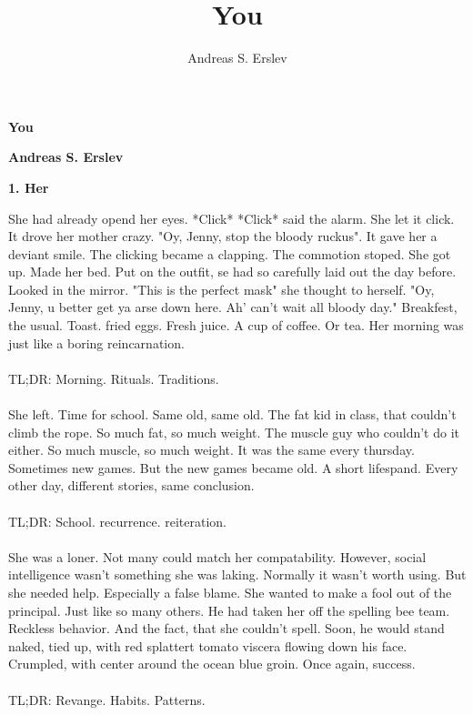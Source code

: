 \documentclass[]{article}
\title{You}
\author{Andreas S. Erslev}
\begin{document}
\begin{center}
	\Large\textbf{You}
\end{center}
\begin{center}
	\large\textbf{Andreas S. Erslev}
\end{center}

\begin{center}
	\large\textbf{1. Her}
\end{center}

She had already opend her eyes. *Click* *Click* said the alarm. She let it click. It drove her mother crazy. "Oy, Jenny, stop the bloody ruckus". It gave her a deviant smile. The clicking became a clapping. The commotion stoped. She got up. Made her bed. Put on the outfit, se had so carefully laid out the day before. Looked in the mirror. "This is the perfect mask" she thought to herself. "Oy, Jenny, u better get ya arse down here. Ah' can't wait all bloody day." Breakfest, the usual. Toast. fried eggs. Fresh juice. A cup of coffee. Or tea. Her morning was just like a boring reincarnation.
\\ \\
TL;DR: Morning. Rituals. Traditions.
\\ \\
She left. Time for school. Same old, same old. The fat kid in class, that couldn't climb the rope. So much fat, so much weight. The muscle guy who couldn't do it either. So much muscle, so much weight. It was the same every thursday. Sometimes new games. But the new games became old. A short lifespand. Every other day, different stories, same conclusion. 
\\ \\
TL;DR: School. recurrence. reiteration.
\\ \\
She was a loner. Not many could match her compatability. However, social intelligence wasn't something she was laking. Normally it wasn't worth using. But she needed help. Especially a false blame. She wanted to make a fool out of the principal. Just like so many others. He had taken her off the spelling bee team. Reckless behavior. And the fact, that she couldn't spell. Soon, he would stand naked, tied up, with red splattert tomato viscera flowing down his face. Crumpled, with center around the ocean blue groin. Once again, success.
\\ \\
TL;DR: Revange. Habits. Patterns.

\newpage
\end{document}
